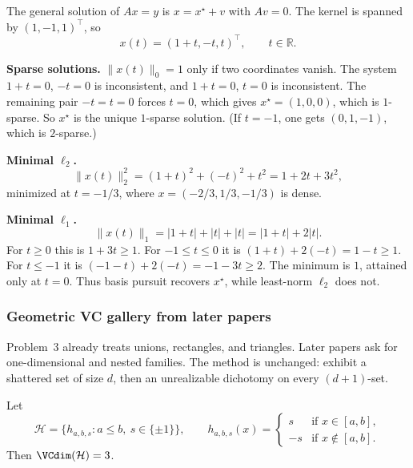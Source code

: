 \begin{solution}
The general solution of $Ax=y$ is $x=x^\star+v$ with $Av=0$. The kernel is spanned by $(1,-1,1)^\top$, so
\[
x(t)=(1+t,-t,t)^\top,
\qquad t\in\mathbb{R}.
\]

\textbf{Sparse solutions.}
$\lVert x(t)\rVert_0=1$ only if two coordinates vanish. The system $1+t=0$, $-t=0$ is inconsistent, and $1+t=0$, $t=0$ is inconsistent. The remaining pair $-t=t=0$ forces $t=0$, which gives $x^\star=(1,0,0)$, which is $1$-sparse. So $x^\star$ is the unique $1$-sparse solution. (If $t=-1$, one gets $(0,1,-1)$, which is $2$-sparse.)

\textbf{Minimal $\ell_2$.}
\[
\lVert x(t)\rVert_2^2=(1+t)^2+(-t)^2+t^2=1+2t+3t^2,
\]
minimized at $t=-1/3$, where $x=(-2/3,1/3,-1/3)$ is dense.

\textbf{Minimal $\ell_1$.}
\[
\lVert x(t)\rVert_1
=
\lvert 1+t\rvert+\lvert t\rvert+\lvert t\rvert
=
\lvert 1+t\rvert+2\lvert t\rvert.
\]
For $t\ge 0$ this is $1+3t\ge 1$. For $-1\le t\le 0$ it is $(1+t)+2(-t)=1-t\ge 1$. For $t\le -1$ it is $(-1-t)+2(-t)=-1-3t\ge 2$. The minimum is $1$, attained only at $t=0$. Thus basis pursuit recovers $x^\star$, while least-norm $\ell_2$ does not.
\end{solution}


\subsubsection{Geometric VC gallery from later papers}
\label{subsubsec:mlu-geo}

Problem~3 already treats unions, rectangles, and triangles. Later papers ask for one-dimensional and nested families. The method is unchanged: exhibit a shattered set of size $d$, then an unrealizable dichotomy on every $(d+1)$-set.

\begin{proposition}
\label{prop:mlu-signed-int}
Let
\[
\mathcal{H}
=
\bigl\{h_{a,b,s}:a\le b,\ s\in\{\pm1\}\bigr\},
\qquad
h_{a,b,s}(x)
=
\begin{cases}
s & \text{if }x\in[a,b],\\
-s & \text{if }x\notin[a,b].
\end{cases}
\]
Then $\VCdim(\mathcal{H})=3$.
\end{proposition}


